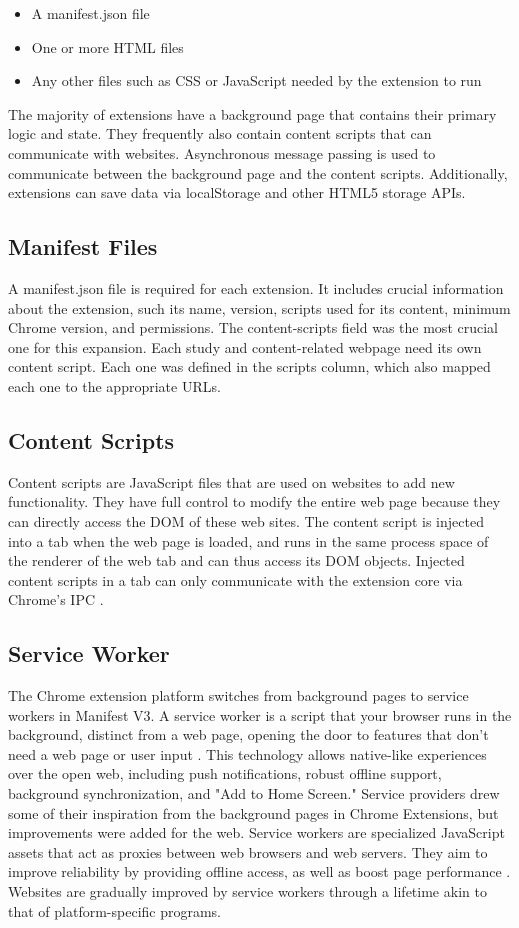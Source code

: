 \begin{itemize}
  \item A manifest.json file
  \item One or more HTML files
  \item Any other files such as CSS or JavaScript needed by the extension to run
\end{itemize}

The majority of extensions have a background page that contains their primary logic and state. They frequently also contain content scripts that can communicate with websites. Asynchronous message passing is used to communicate between the background page and the content scripts. Additionally, extensions can save data via localStorage and other HTML5 storage APIs.

\subsection{Manifest Files}
A manifest.json file is required for each extension. It includes crucial information about the extension, such its name, version, scripts used for its content, minimum Chrome version, and permissions. The content-scripts field was the most crucial one for this expansion. Each study and content-related webpage need its own content script. Each one was defined in the scripts column, which also mapped each one to the appropriate URLs.

\subsection{Content Scripts}
Content scripts are JavaScript files that are used on websites to add new functionality. They have full control to modify the entire web page because they can directly access the DOM of these web sites. The content script is injected into a tab when the web page is loaded, and runs in the same process space of the renderer of the web tab and can thus access its DOM objects. Injected content scripts in a tab can only communicate with the extension core via Chrome's IPC \autocite{liu2012chrome}.

\subsection{Service Worker}
The Chrome extension platform switches from background pages to service workers in Manifest V3. A service worker is a script that your browser runs in the background, distinct from a web page, opening the door to features that don't need a web page or user input \autocite{chrome2021service}. This technology allows native-like experiences over the open web, including push notifications, robust offline support, background synchronization, and "Add to Home Screen." Service providers drew some of their inspiration from the background pages in Chrome Extensions, but improvements were added for the web.
Service workers are specialized JavaScript assets that act as proxies between web browsers and web servers. They aim to improve reliability by providing offline access, as well as boost page performance \autocite{chrome2021service}. Websites are gradually improved by service workers through a lifetime akin to that of platform-specific programs.


